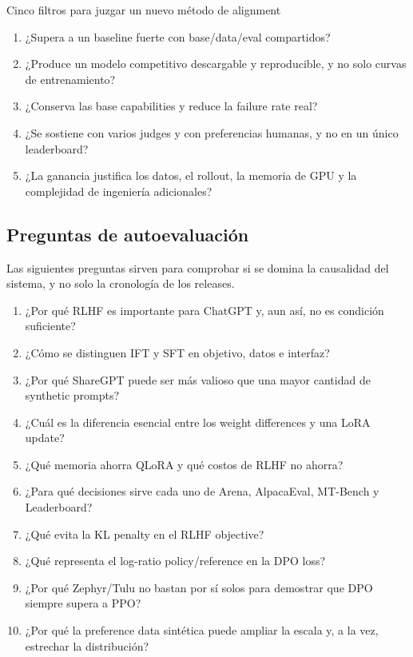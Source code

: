 \documentclass[a4paper]{article}
\begin{document}
\begin{importantbox}{Cinco filtros para juzgar un nuevo método de alignment}
\begin{enumerate}
  \item ¿Supera a un baseline fuerte con base/data/eval compartidos?
  \item ¿Produce un modelo competitivo descargable y reproducible, y no solo curvas de entrenamiento?
  \item ¿Conserva las base capabilities y reduce la failure rate real?
  \item ¿Se sostiene con varios judges y con preferencias humanas, y no en un único leaderboard?
  \item ¿La ganancia justifica los datos, el rollout, la memoria de GPU y la complejidad de ingeniería adicionales?
\end{enumerate}
\end{importantbox}

\subsection{Preguntas de autoevaluación}

Las siguientes preguntas sirven para comprobar si se domina la causalidad del sistema, y no solo la cronología de los releases.

\begin{enumerate}
  \item ¿Por qué RLHF es importante para ChatGPT y, aun así, no es condición suficiente?
  \item ¿Cómo se distinguen IFT y SFT en objetivo, datos e interfaz?
  \item ¿Por qué ShareGPT puede ser más valioso que una mayor cantidad de synthetic prompts?
  \item ¿Cuál es la diferencia esencial entre los weight differences y una LoRA update?
  \item ¿Qué memoria ahorra QLoRA y qué costos de RLHF no ahorra?
  \item ¿Para qué decisiones sirve cada uno de Arena, AlpacaEval, MT-Bench y Leaderboard?
  \item ¿Qué evita la KL penalty en el RLHF objective?
  \item ¿Qué representa el log-ratio policy/reference en la DPO loss?
  \item ¿Por qué Zephyr/Tulu no bastan por sí solos para demostrar que DPO siempre supera a PPO?
  \item ¿Por qué la preference data sintética puede ampliar la escala y, a la vez, estrechar la distribución?
\end{enumerate}
\end{document}
